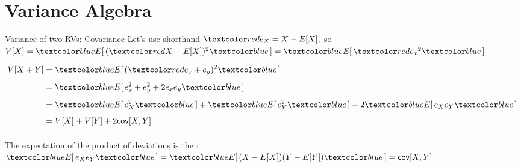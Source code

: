 \documentclass[10pt,sans,english,compress,xcolor=dvipsnames]{beamer}
\begin{document}
%
%
%
%
%
%
%


\section{Variance Algebra}

\begin{frame}{Variance of two RVs: Covariance}
\footnotesize
Let's use shorthand $\rbl{e_X = X - E[X]}$, so $V[X] = \bbl{E[\,} (\rbl{X - E[X]} )^2\bbl{\,]} = \bbl{E[\,}\rbl{e_x}^2\bbl{\,]}$

\begin{align*}
V[X+Y]  & = \bbl{E[\,}(\rbl{e_x + e_y})^2\bbl{\,]} \hspace{10cm} \\[1ex]	    
            & = \bbl{E[\,} e_x^2 + e_y^2 +2 e_x e_y  \bbl{\,]} \\[1ex]
            & = \bbl{E[\,}  e^2_X\bbl{\,]} + \bbl{E[\,} e^2_Y\bbl{\,]} + 2\bbl{E[\,}  e_X  e_Y  \bbl{\,]} \\[1ex]
            & = V[X] + V[Y] + 2 \mathsf{cov}[X,Y]\\[1ex]
\end{align*}

\small
The expectation of the product of deviations is the :\\

 $\bbl{E[\,}  e_X  e_Y  \bbl{\,]} = \bbl{E[\,}  (X-E[X])(Y-E[Y] ) \bbl{\,]} = \mathsf{cov}[X,Y]$\\[1ex]
 



 

\end{frame} 
\end{document}
